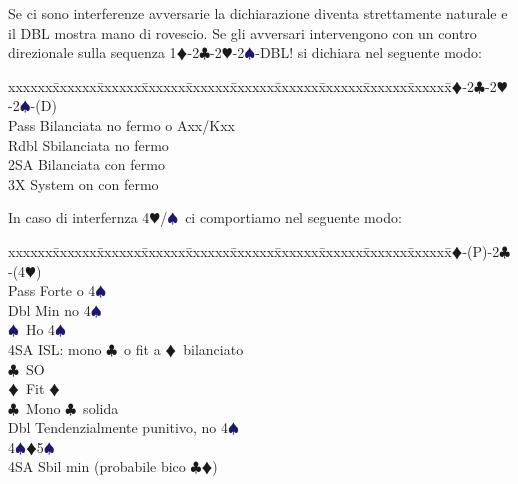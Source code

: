 \documentclass[a4paper,italian]{article}
\newcommand{\BC}{\textcolor{OliveGreen}{$\clubsuit$}}
\newcommand{\BD}{\textcolor{RedOrange}{$\vardiamondsuit$}}
\newcommand{\BH}{\textcolor{Red2}{$\varheartsuit${}}}
\newcommand{\BS}{\textcolor{MidnightBlue}{$\spadesuit${}}}
\newenvironment{bidtable}
{\begin{tabbing}

    xxxxxx\=xxxxxx\=xxxxxx\=xxxxxx\=xxxxxx\=xxxxxx\=xxxxxx\=xxxxxx\=xxxxxx\=xxxxxx\=\kill}
{\end{tabbing} }%
\newenvironment{attenzione}[1]
{\begin{tcolorbox}[colframe=red!80!white,title=#1]}
    {
\end{tcolorbox} }%
\begin{document}
                                    \bigbreak
                                    \begin{attenzione}{Interferenze}
                                        Se ci sono interferenze avversarie la dichiarazione diventa strettamente naturale e il DBL mostra mano di rovescio. Se gli avversari intervengono con un contro direzionale sulla sequenza 1\BD -2\BC -2\BH -2\BS -DBL! si dichiara nel seguente modo:
                                        \bigbreak
                                        \begin{bidtable}
                                            1\BD-2\BC-2\BH-2\BS-(D)\+\\
                                            Pass \> Bilanciata no fermo o Axx/Kxx\\
                                            Rdbl \> Sbilanciata no fermo\\
                                            2SA \> Bilanciata con fermo\\
                                            3X \> System on con fermo\-
                                        \end{bidtable}
                                        In caso di interfernza 4\BH /\BS\ ci comportiamo nel seguente modo:
                                        \bigbreak
                                        \begin{bidtable}
                                            1\BD-(P)-2\BC-(4\BH)\+\\
                                            Pass \> Forte o 4\BS\ \\
                                            \>Dbl Min no 4\BS\ \\
                                            \BS\ Ho 4\BS\ \\
                                            \>4SA ISL: mono \BC\ o fit a \BD\ bilanciato\\
                                            \> \BC\ SO\\
                                            \> \> \BD\ Fit \BD\\
                                            \BC\ Mono \BC\ solida\\
                                            Dbl \> Tendenzialmente punitivo, no 4\BS \\
                                            4\BS {}\BD 5\BS \\
                                            4SA \> Sbil min (probabile bico \BC \BD )\\

\end{bidtable}
\end{attenzione}
\end{document}
